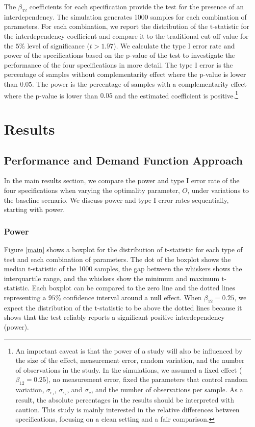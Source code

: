 \documentclass[12pt]{article}
\begin{document}
The $\beta_{12}$ coefficients for each specification provide the test for the presence of an interdependency. The simulation generates 1000 samples for each combination of parameters. For each combination, we report the distribution of the t-statistic for the interdependency coefficient and compare it to the traditional cut-off value for the $5\%$ level of significance ($t > 1.97$). We calculate the type I error rate and power of the specifications based on the p-value of the test to investigate the performance of the four specifications in more detail. The type I error is the percentage of samples without complementarity effect where the p-value is lower than $0.05$. The power is the percentage of samples with a complementarity effect where the p-value is lower than $0.05$ and the estimated coefficient is positive.\footnote{An important caveat is that the power of a study will also be influenced by the size of the effect, measurement error, random variation, and the number of observations in the study. In the simulations, we assumed a fixed effect ($\beta_{12} = 0.25$), no measurement error, fixed the parameters that control random variation, $\sigma_{\epsilon_1}$, $\sigma_{\epsilon_2}$, and $\sigma_{\nu}$, and the number of observations per sample. As a result, the absolute percentages in the results should be interpreted with caution. This study is mainly interested in the relative differences between specifications, focusing on a clean setting and a fair comparison.}

\section{Results}
\subsection{Performance and Demand Function
Approach}\label{performance-and-demand-function-approach}

In the main results section, we compare the power and type I error rate of the four specifications when varying the optimality parameter, $O$, under variations to the baseline scenario. We discuss power and type I error rates sequentially, starting with power.

\subsubsection{Power}\label{Power}
Figure \ref{main} shows a boxplot for the distribution of t-statistic for each type of test and each combination of parameters. The dot of the boxplot shows the median t-statistic of the 1000 samples, the gap between the whiskers shows the interquartile range, and the whiskers show the minimum and maximum t-statistic. Each boxplot can be compared to the zero line and the dotted lines representing a $95\%$ confidence interval around a null effect. When $\beta_{12} = 0.25$, we expect the distribution of the t-statistic to be above the dotted lines because it shows that the test reliably reports a significant positive interdependency (power).  
\end{document}

